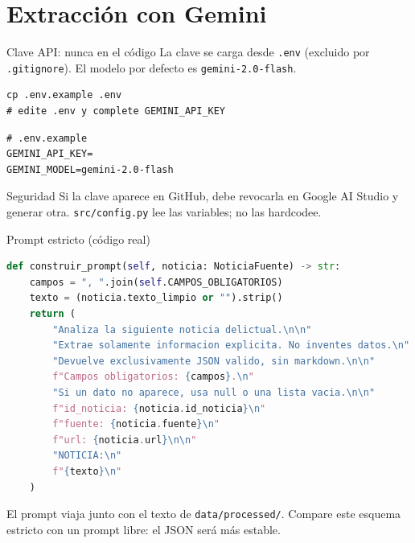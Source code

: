 \documentclass[11pt,aspectratio=169]{beamer}
\newcommand{\code}[1]{\texttt{#1}}
\begin{document}
\section{Extracción con Gemini}

\begin{frame}[fragile]{Clave API: nunca en el código}
\footnotesize
La clave se carga desde \code{.env} (excluido por \code{.gitignore}). El modelo por defecto es \code{gemini-2.0-flash}.

\vspace{0.15cm}
\begin{lstlisting}
cp .env.example .env
# edite .env y complete GEMINI_API_KEY
\end{lstlisting}

\vspace{0.1cm}
\begin{lstlisting}
# .env.example
GEMINI_API_KEY=
GEMINI_MODEL=gemini-2.0-flash
\end{lstlisting}

\scriptsize
\begin{alertblock}{Seguridad}
Si la clave aparece en GitHub, debe revocarla en Google AI Studio y generar otra. \code{src/config.py} lee las variables; no las hardcodee.
\end{alertblock}
\end{frame}

\begin{frame}[fragile]{Prompt estricto (código real)}
\tiny
\begin{lstlisting}[language=Python]
def construir_prompt(self, noticia: NoticiaFuente) -> str:
    campos = ", ".join(self.CAMPOS_OBLIGATORIOS)
    texto = (noticia.texto_limpio or "").strip()
    return (
        "Analiza la siguiente noticia delictual.\n\n"
        "Extrae solamente informacion explicita. No inventes datos.\n"
        "Devuelve exclusivamente JSON valido, sin markdown.\n\n"
        f"Campos obligatorios: {campos}.\n"
        "Si un dato no aparece, usa null o una lista vacia.\n\n"
        f"id_noticia: {noticia.id_noticia}\n"
        f"fuente: {noticia.fuente}\n"
        f"url: {noticia.url}\n\n"
        "NOTICIA:\n"
        f"{texto}\n"
    )
\end{lstlisting}

\scriptsize
El prompt viaja junto con el texto de \code{data/processed/}. Compare este esquema estricto con un prompt libre: el JSON será más estable.
\end{frame}
\end{document}

